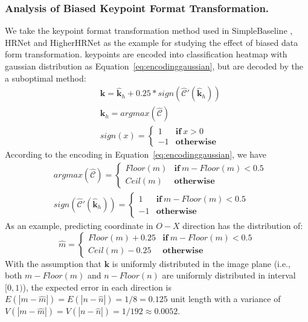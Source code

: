 \documentclass[10pt,journal,compsoc]{IEEEtran}
\begin{document}
\subsubsection{Analysis of Biased Keypoint Format Transformation.}
We take the keypoint format transformation method used in SimpleBaseline \cite{SBNet}, HRNet \cite{HRNet} and HigherHRNet \cite{Higher} as the example for studying the effect of biased data form transformation. keypoints are encoded into classification heatmap with gaussian distribution as Equation~\ref{eq:encodinggaussian}, but are decoded by the a suboptimal method:
\begin{equation}
    \label{eq:biasdecoding}
    \begin{split}
    &\hat{\textbf{k}} = \hat{\textbf{k}}_h + 0.25 * sign(\hat{\mathcal{C}}'(\hat{\textbf{k}}_{h}))\\
    &\hat{\textbf{k}}_{h} = argmax(\hat{\mathcal{C}})\\
    &sign(x) = \begin{cases}
		      1  & \textbf{if}\  x>0\\
		      -1 & \textbf{otherwise}
	\end{cases}
    \end{split}
\end{equation}
According to the encoding in Equation~\ref{eq:encodinggaussian}, we have
\begin{equation}
    \begin{split}
	&argmax(\hat{\mathcal{C}}) =
    \begin{cases}
		Floor(m)  \!\! & \textbf{if}\ m-Floor(m)<0.5\\
        Ceil(m)  \!\! & \textbf{otherwise}
	\end{cases}\\
    &sign(\hat{\mathcal{C}}'(\hat{\textbf{k}}_{h})) =
    \begin{cases}
		      1  & \textbf{if}\ m-Floor(m)<0.5\\
		      -1 & \textbf{otherwise}
	\end{cases}
    \end{split}
\end{equation}
As an example, predicting coordinate in $O-X$ direction has the distribution of:
\begin{equation}
	\hat{m} =
    \begin{cases}
		Floor(m)+0.25  \!\! & \textbf{if}  \ m-Floor(m)<0.5\\
        Ceil(m) - 0.25  \!\! & \textbf{otherwise}
	\end{cases}
\end{equation}
With the assumption that $\textbf{k}$ is uniformly distributed in the image plane (i.e., both $m-Floor(m)$ and $n-Floor(n)$ are uniformly distributed in interval $[0,1)$), the expected error in each direction is $E(|m-\hat{m}|) = E(|n-\hat{n}|) =1/8 = 0.125$ unit length with a variance of $V(|m-\hat{m}|)= V(|n-\hat{n}|) =1/192\approx0.0052$.
\end{document}
